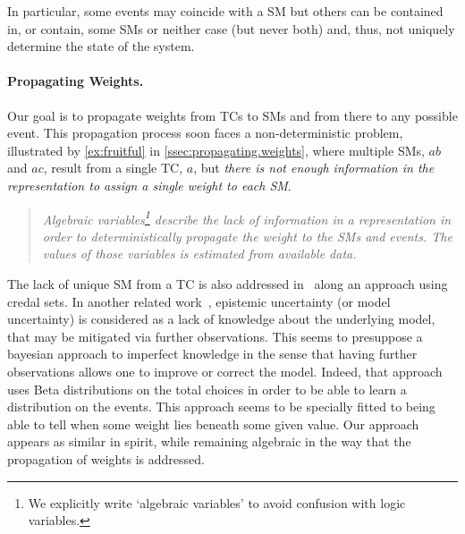 \documentclass[x11names]{tlp}
\renewcommand{\cite}{\citep}
\begin{document}

In particular, some events may coincide with a \acl{SM} but others can be contained in, or contain, some \acp{SM} or neither case (but never both) and, thus, not uniquely determine the state of the system.

\paragraph{Propagating Weights.}

Our goal is to propagate weights from \acp{TC} to \acp{SM} and from there to any possible event.
This propagation process soon faces a non-deterministic problem, illustrated by \cref{ex:fruitful} in \cref{ssec:propagating.weights}, where multiple \acp{SM}, $ab$ and $ac$, result from a single \ac{TC}, $a$, but \emph{there is not enough information in the representation to assign a single weight to each \ac{SM}}.
\begin{quotation}\em
	Algebraic variables\footnote{We explicitly write `algebraic variables' to avoid confusion with logic variables.} describe the lack of information in a representation in order to deterministically propagate the weight to the \aclp{SM} and events. The values of those variables is estimated from available data.
\end{quotation}

The lack of unique \acl{SM} from a \acl{TC} is also addressed in~\cite{cozman2020joy} along an approach using credal sets.
In another related work~\cite{verreet2022inference}, epistemic uncertainty (or model uncertainty) is considered as a lack of knowledge about the underlying model, that may be mitigated via further observations.
This seems to presuppose a bayesian approach to imperfect knowledge in the sense that having further observations allows one to improve or correct the model.
Indeed, that approach uses Beta distributions on the total choices in order to be able to learn a distribution on the events.
This approach seems to be specially fitted to being able to tell when some weight lies beneath some given value.
Our approach appears as similar in spirit, while remaining algebraic in the way that the propagation of weights is addressed.
\end{document}
